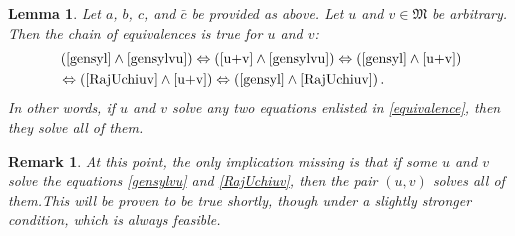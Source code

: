 \documentclass{article}
\newtheorem{remark}{Remark}[section]
\newtheorem{lemma}{Lemma}[section]
\theoremstyle{definition}
\def\M{\mathfrak{M}}
\begin{document}
\begin{lemma}\label{2of4} Let $a$, $b$, $c$, and $\bar{c}$ be provided as above. Let $u$ and $v\in\M$ be arbitrary. Then the chain of equivalences is true for $u$ and $v$:
\begin{eqnarray}
\label{equivalence}
\begin{aligned}
&\left(\eqref{gensyl}\wedge\eqref{gensylvu}\right)\Leftrightarrow\left(\eqref{u+v}\wedge\eqref{gensylvu}\right)\Leftrightarrow\left(\eqref{gensyl}\wedge\eqref{u+v}\right)\\
&\Leftrightarrow\left(\eqref{RajUchiuv}\wedge\eqref{u+v}\right)\Leftrightarrow\left(\eqref{gensyl}\wedge\eqref{RajUchiuv}\right).
\end{aligned}
\end{eqnarray} 
In other words, if $u$ and $v$ solve any two equations enlisted in \eqref{equivalence}, then they solve all of them.
\end{lemma}
\begin{remark} At this point, the only implication missing is that if some $u$ and $v$ solve the equations \eqref{gensylvu} and \eqref{RajUchiuv}, then the pair $(u,v)$ solves all of them.This will be proven to be true shortly, though under a slightly stronger condition, which is always feasible.
\end{remark}
\end{document}
